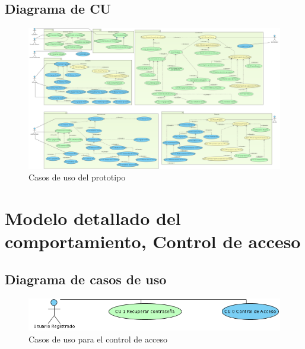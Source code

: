 \documentclass[10pt]{book}
\begin{document}
\section{Diagrama de CU}

\begin{figure}[htbp!]
	\begin{center}
		\includegraphics[angle=90,height=\textheight]{images/casosDeUso}
		\caption{Casos de uso del prototipo}
		\label{fig:default}
	\end{center}
\end{figure}

\chapter{Modelo detallado del comportamiento, Control de acceso} 

\section{Diagrama de casos de uso}

\begin{figure}[htbp!]
	\begin{center}
		\includegraphics[width=.3\textwidth]{images/CUcontrolAcceso}
		\caption{Casos de uso para el control de acceso}
		\label{fig:default}
	\end{center}
\end{figure}

\end{document}
